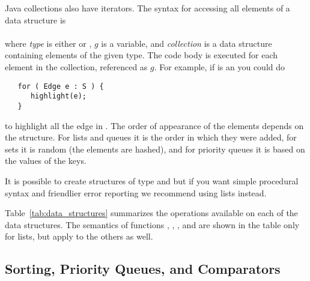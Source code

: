 Java collections also have iterators. The syntax for accessing all elements
of a data structure is\\
\hspace*{1em}\\
where \emph{type} is either  or , $g$ is a variable,
and \emph{collection} is a data structure containing elements of the given
type. The code body is executed for each element in the collection,
referenced as $g$. For example, if  is an  you could do

\begin{minipage}{\textwidth}
\begin{verbatim}
   for ( Edge e : S ) {
      highlight(e);
   }
\end{verbatim}
\end{minipage}

to highlight all the edge in .
The order of appearance of the elements depends on the structure.
For lists and queues it is the order in which they were added, for sets it is
random (the elements are hashed), and for priority queues it is based on the
values of the keys.

It is possible to create structures of type  and
 but if you want simple procedural syntax and friendlier error reporting
we recommend using lists instead.

Table~\ref{tab:data_structures} summarizes the operations available on each
of the data structures.
The semantics of functions , , , and
 are shown in the table only for lists, but apply to the others as well.

\subsection{Sorting, Priority Queues, and Comparators} \label{sec:sorting}



